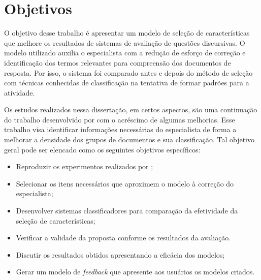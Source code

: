 \begin{comment}
Este capítulo apresenta o contexto, motivação e objetivos deste trabalho, bem como os métodos de pesquisa aplicados e sua organização textual, com o intuito de proporcionar ao leitor melhor compreensão do universo no qual se encontra o problema que buscamos solucionar, classificar grandes massas de dados provenientes de redes sociais com menor esforço humano possível nesse processo. 
\end{comment}

\section{Objetivos}

O objetivo desse trabalho é apresentar um modelo de seleção de características que melhore os resultados de sistemas de avaliação de questões discursivas. O modelo utilizado auxilia o especialista com a redução de esforço de correção e identificação dos termos relevantes para compreensão dos documentos de resposta. Por isso, o sistema foi comparado antes e depois do método de seleção com técnicas conhecidas de classificação na tentativa de formar padrões para a atividade.

Os estudos realizados nessa dissertação, em certos aspectos, são uma continuação do trabalho desenvolvido por \cite{pissinati2014-master} com o acréscimo de algumas melhorias. Esse trabalho visa identificar informações necessárias do especialista de forma a melhorar a densidade dos grupos de documentos e sua classificação. Tal objetivo geral pode ser elencado como os seguintes objetivos específicos:

\begin{itemize}
	\item Reproduzir os experimentos realizados por \cite{pissinati2014-master};
	\item Selecionar os itens necessários que aproximem o modelo à correção do especialista;
	\item Desenvolver sistemas classificadores para comparação da efetividade da seleção de características;
	\item Verificar a validade da proposta conforme os resultados da avaliação.
	\item Discutir os resultados obtidos apresentando a eficácia dos modelos;
	\item Gerar um modelo de \textit{feedback} que apresente aos usuários os modelos criados.
\end{itemize}

